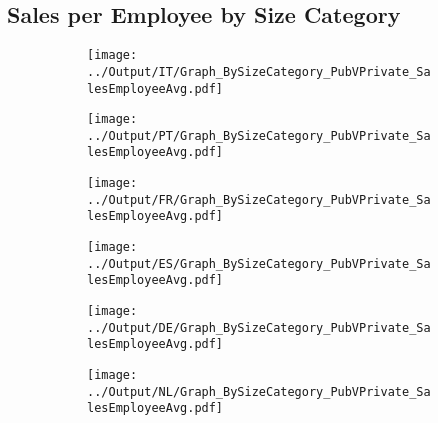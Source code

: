 \documentclass[12pt,notitlepage]{article}
\begin{document}
\subsection{Sales per Employee by Size Category}
\begin{figure}[!htpb]
\centering
\begin{subfigure}{.49\textwidth}
    \centering
 \texttt{[image: ../Output/IT/Graph\_BySizeCategory\_PubVPrivate\_SalesEmployeeAvg.pdf]}
\end{subfigure}%
\begin{subfigure}{.49\textwidth}
    \centering
 \texttt{[image: ../Output/PT/Graph\_BySizeCategory\_PubVPrivate\_SalesEmployeeAvg.pdf]}
\end{subfigure}
\begin{subfigure}{.49\textwidth}
    \centering
 \texttt{[image: ../Output/FR/Graph\_BySizeCategory\_PubVPrivate\_SalesEmployeeAvg.pdf]}
\end{subfigure}%
\begin{subfigure}{.49\textwidth}
    \centering
 \texttt{[image: ../Output/ES/Graph\_BySizeCategory\_PubVPrivate\_SalesEmployeeAvg.pdf]}
\end{subfigure}
\begin{subfigure}{.49\textwidth}
    \centering
 \texttt{[image: ../Output/DE/Graph\_BySizeCategory\_PubVPrivate\_SalesEmployeeAvg.pdf]}
\end{subfigure}
\begin{subfigure}{.49\textwidth}
    \centering
 \texttt{[image: ../Output/NL/Graph\_BySizeCategory\_PubVPrivate\_SalesEmployeeAvg.pdf]}
\end{subfigure}
\end{figure}
\clearpage
\end{document}
